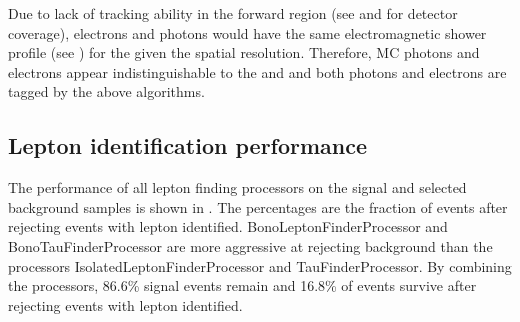 Due to lack of tracking ability in the forward region (see \Section{} and \Section{} for detector coverage), electrons and photons would have the same electromagnetic shower profile (see \Section{}) for the given the \ECAL spatial resolution. Therefore, MC photons and electrons appear indistinguishable to the \BeamCAL and \LumiCAL and both photons and electrons are tagged by the above algorithms.







\subsection{Lepton identification performance}

The performance of all lepton finding processors on the signal and selected background samples is shown in . The percentages are the fraction of events after rejecting events with lepton identified. BonoLeptonFinderProcessor and BonoTauFinderProcessor are more aggressive at rejecting background than the processors IsolatedLeptonFinderProcessor and TauFinderProcessor. By combining the processors, 86.6\% signal events remain and 16.8\% of \HepProcess{\Pep \Pem \to \Pquark\Pquark\Pquark\Pquark\Plepton\Pnu} events survive after rejecting events with lepton identified.

